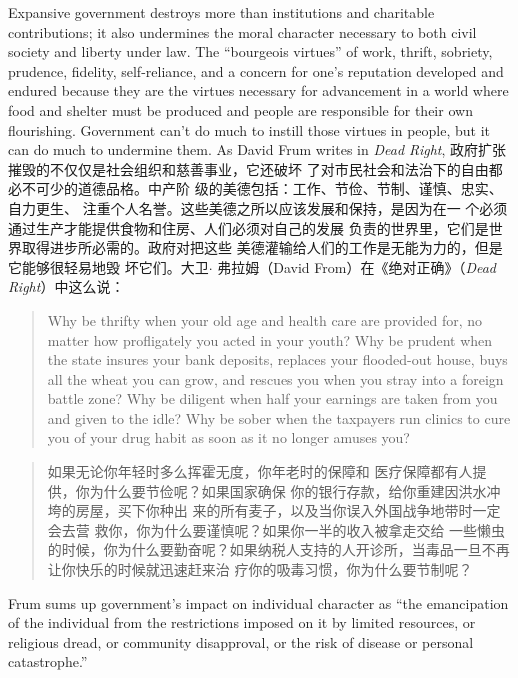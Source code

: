 \begin{paracol}{2}
Expansive government destroys more than institutions and
charitable contributions; it also undermines the moral character
necessary to both civil society and liberty under law. The ``bourgeois virtues'' of work, thrift, sobriety, prudence, fidelity, self-reliance, and a concern for one's reputation developed and
endured because they are the virtues necessary for advancement
in a world where food and shelter must be produced and people
are responsible for their own flourishing. Government can't do
much to instill those virtues in people, but it can do much to
undermine them. As David Frum writes in \textit{Dead Right},
\switchcolumn
政府扩张摧毁的不仅仅是社会组织和慈善事业，它还破坏
了对市民社会和法治下的自由都必不可少的道德品格。中产阶
级的美德包括：工作、节俭、节制、谨慎、忠实、自力更生、
注重个人名誉。这些美德之所以应该发展和保持，是因为在一
个必须通过生产才能提供食物和住房、人们必须对自己的发展
负责的世界里，它们是世界取得进步所必需的。政府对把这些
美德灌输给人们的工作是无能为力的，但是它能够很轻易地毁
坏它们。大卫$\cdot$ 弗拉姆（David From）在《绝对正确》（\textit{Dead Right}）中这么说：
\switchcolumn*
\begin{quote}
Why be thrifty when your old age and health care are provided
for, no matter how profligately you acted in your youth? Why be
prudent when the state insures your bank deposits, replaces your
flooded-out house, buys all the wheat you can grow, and rescues
you when you stray into a foreign battle zone? Why be diligent
when half your earnings are taken from you and given to the
idle? Why be sober when the taxpayers run clinics to cure you of
your drug habit as soon as it no longer amuses you?
\end{quote}
\switchcolumn
\begin{quote}
如果无论你年轻时多么挥霍无度，你年老时的保障和
医疗保障都有人提供，你为什么要节俭呢？如果国家确保
你的银行存款，给你重建因洪水冲垮的房屋，买下你种出
来的所有麦子，以及当你误入外国战争地带时一定会去营
救你，你为什么要谨慎呢？如果你一半的收入被拿走交给
一些懒虫的时候，你为什么要勤奋呢？如果纳税人支持的人开诊所，当毒品一旦不再让你快乐的时候就迅速赶来治
疗你的吸毒习惯，你为什么要节制呢？
\end{quote}
\switchcolumn*
Frum sums up government's impact on individual character as
``the emancipation of the individual from the restrictions imposed on it by limited resources, or religious dread, or community disapproval, or the risk of disease or personal catastrophe.''

\end{paracol}
